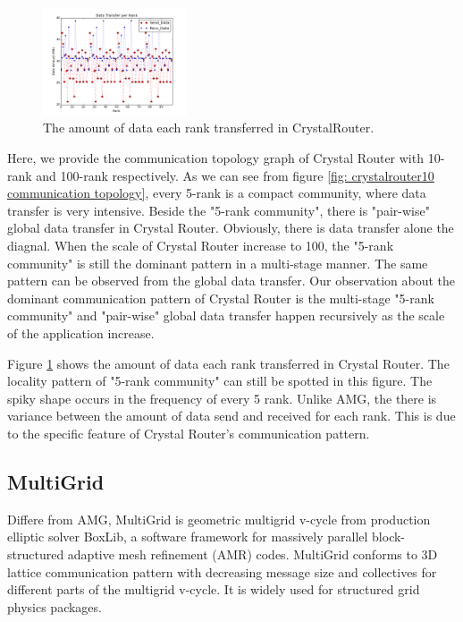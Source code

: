 \documentclass[conference]{IEEEtran}
\begin{document}
\begin{figure}[h!] 
  \centering
  \includegraphics[width=0.38\textwidth]{figs/appstudy/cr/cr_data_transfer}
   \caption{The amount of data each rank transferred in CrystalRouter. }
   \label{fig: cr data trans}
\end{figure}

Here, we provide the communication topology graph of Crystal Router with 10-rank and 100-rank respectively. As we can see from figure \ref{fig: crystalrouter10 communication topology}, every 5-rank is a compact community, where data transfer is very intensive. Beside the "5-rank community", there is "pair-wise" global data transfer in Crystal Router. Obviously, there is data transfer alone the diagnal. When the scale of Crystal Router increase to 100, the "5-rank community" is still the dominant pattern in a multi-stage manner. The same pattern can be observed from the global data transfer. Our observation about the dominant communication pattern of Crystal Router is the multi-stage "5-rank community" and "pair-wise" global data transfer happen recursively as the scale of the application increase.

Figure \ref{fig: cr data trans} shows the amount of data each rank transferred in Crystal Router. The locality pattern of "5-rank community" can still be spotted in this figure. The spiky shape occurs in the frequency of every 5 rank. Unlike AMG, the there is variance between the amount of data send and received for each rank. This is due to the specific feature of Crystal Router's communication pattern.


\subsection{MultiGrid}
\label{sec:multigrid}

Differe from AMG, MultiGrid is geometric multigrid v-cycle from production elliptic solver BoxLib, a software framework for massively parallel block-structured adaptive mesh refinement (AMR) codes. MultiGrid conforms to 3D lattice communication pattern with decreasing message size and collectives for different parts of the multigrid v-cycle. It is widely used for structured grid physics packages.
\end{document}
